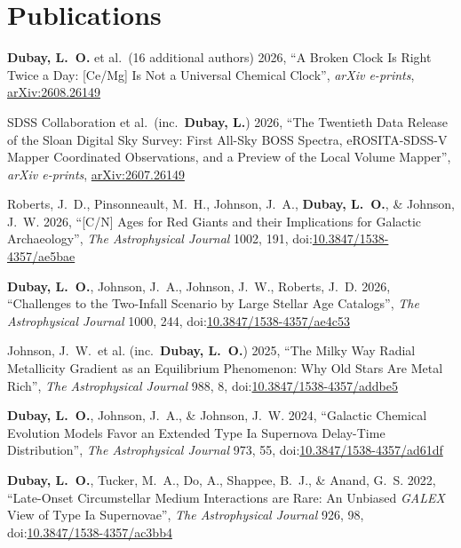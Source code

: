 \section*{Publications}


\noindent
{\bf Dubay, L.\ O.} et al.\ (16 additional authors) 2026, ``A Broken Clock Is Right Twice a Day: [Ce/Mg] Is Not a Universal Chemical Clock'', {\it arXiv e-prints}, \href{https://arxiv.org/abs/2608.26261}{arXiv:2608.26149}

\vspace{12pt}
\noindent
SDSS Collaboration et al.\ (inc.\ {\bf Dubay, L.}) 2026, ``The Twentieth Data Release of the Sloan Digital Sky Survey: First All-Sky BOSS Spectra, eROSITA-SDSS-V Mapper Coordinated Observations, and a Preview of the Local Volume Mapper'', {\it arXiv e-prints}, \href{https://arxiv.org/abs/2607.26149}{arXiv:2607.26149}

\vspace{12pt}
\noindent
Roberts, J.\ D., Pinsonneault, M.\ H., Johnson, J.\ A., {\bf Dubay, L.\ O.}, \& Johnson, J.\ W. 2026, ``[C/N] Ages for Red Giants and their Implications for Galactic Archaeology'', {\it The Astrophysical Journal} 1002, 191, doi:\href{https://doi.org/10.3847/1538-4357/ae5bae}{10.3847/1538-4357/ae5bae}

\vspace{12pt}
\noindent
{\bf Dubay, L.\ O.}, Johnson, J.\ A., Johnson, J.\ W., Roberts, J.\ D. 2026, ``Challenges to the Two-Infall Scenario by Large Stellar Age Catalogs'', {\it The Astrophysical Journal} 1000, 244, doi:\href{https://doi.org/10.3847/1538-4357/ae4c53}{10.3847/1538-4357/ae4c53}


\vspace{12pt}
\noindent
Johnson, J.\ W.\ et al. (inc.\ {\bf Dubay, L.\ O.}) 2025, ``The Milky Way Radial Metallicity Gradient as an Equilibrium Phenomenon: Why Old Stars Are Metal Rich'', {\it The Astrophysical Journal} 988, 8, doi:\href{https://iopscience.iop.org/article/10.3847/1538-4357/addbe5}{10.3847/1538-4357/addbe5}

\vspace{12pt}
\noindent
{\bf Dubay, L.\ O.}, Johnson, J.\ A., \& Johnson, J.\ W. 2024, ``Galactic Chemical Evolution Models Favor an Extended Type Ia Supernova Delay-Time Distribution'', {\it The Astrophysical Journal} 973, 55, doi:\href{https://doi.org/10.3847/1538-4357/ad61df}{10.3847/1538-4357/ad61df}

\vspace{12pt}
\noindent
{\bf Dubay, L.\ O.}, Tucker, M.\ A., Do, A., Shappee, B.\ J., \& Anand, G.\ S. 2022, ``Late-Onset Circumstellar Medium Interactions are Rare: An Unbiased \textit{GALEX} View of Type Ia Supernovae'', {\it The Astrophysical Journal} 926, 98, doi:\href{https://doi.org/10.3847/1538-4357/ac3bb4}{10.3847/1538-4357/ac3bb4}